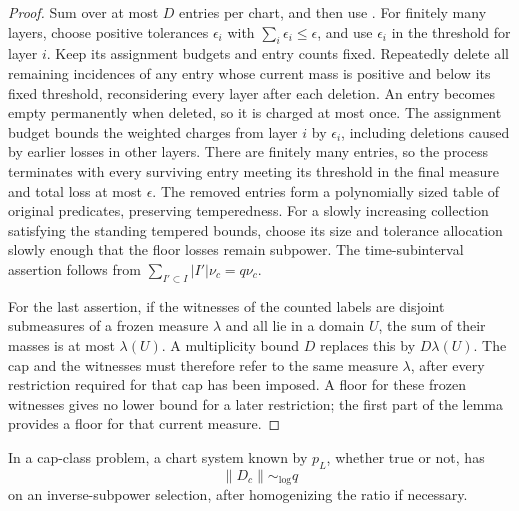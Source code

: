 \begin{proof}
Sum  over at most \(D\) entries per
chart, and then use .
For finitely many layers, choose positive tolerances
\(\epsilon_i\) with \(\sum_i\epsilon_i\le\epsilon\), and use
\(\epsilon_i\) in the threshold for layer \(i\). Keep its assignment
budgets and entry counts fixed. Repeatedly delete all remaining
incidences of any entry whose current mass is positive and below its
fixed threshold,
reconsidering every layer after each deletion. An entry becomes empty
permanently when deleted, so it is charged at most once. The assignment
budget bounds the weighted charges from layer \(i\) by
\(\epsilon_i\), including deletions caused by earlier losses in other
layers. There are finitely many entries, so the process terminates
with every surviving entry meeting its threshold in the final measure
and total loss at most \(\epsilon\). The removed entries form a
polynomially sized table of original predicates, preserving temperedness.
For a slowly increasing collection satisfying the standing tempered
bounds, choose its size and tolerance allocation slowly enough that
the floor losses remain subpower.
The time-subinterval assertion follows from
\(\sum_{I'\subset I}|I'|\nu_c=q\nu_c\).

For the last assertion, if the witnesses of the counted
labels are disjoint submeasures of a frozen measure
\(\lambda\) and all lie in a domain \(U\), the sum of their
masses is at most \(\lambda(U)\).  A multiplicity bound \(D\)
replaces this by \(D\lambda(U)\).
The cap and the witnesses must therefore refer to the same
measure \(\lambda\), after every restriction required for that
cap has been imposed. A floor for these frozen witnesses gives no
lower bound for a later restriction; the first part of the lemma
provides a floor for that current measure.
\end{proof}

\begin{lemma}
\label{a01:largest-axis}
In a cap-class problem, a chart system known by \(p_L\),
whether true or not, has
\[
 \|D_c\|\sim_{\log}q
\]
on an inverse-subpower selection, after homogenizing the
ratio if necessary.
\end{lemma}

